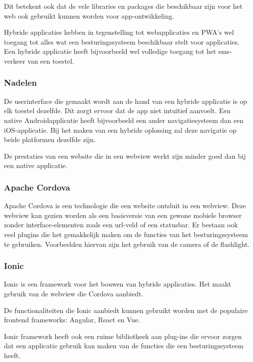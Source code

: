 		Dit betekent ook dat de vele libraries en packages die beschikbaar zijn voor het web ook gebruikt kunnen worden voor app-ontwikkeling.
		
		Hybride applicaties hebben in tegenstelling tot webapplicaties en PWA's wel toegang tot alles wat een besturingssysteem beschikbaar stelt voor applicaties. Een hybride applicatie heeft bijvoorbeeld wel volledige toegang tot het sms-verkeer van een toestel.
		\autocite{Ionic2020}
	
	\subsubsection{Nadelen}
		De userinterface die gemaakt wordt aan de hand van een hybride applicatie is op elk toestel dezelfde. Dit zorgt ervoor dat de app niet intuïtief aanvoelt. Een native Androidapplicatie heeft bijvoorbeeld een ander navigatiesysteem dan een iOS-applicatie. Bij het maken van een hybride oplossing zal deze navigatie op beide platformen dezelfde zijn.
		
		De prestaties van een website die in een webview werkt zijn minder goed dan bij een native applicatie.
		\autocite{Asp2017}	

		
	\subsubsection{Apache Cordova}
		Apache Cordova is een technologie die een website ontsluit in een webview. Deze webview kan gezien worden als een basisversie van een gewone mobiele browser zonder interface-elementen zoals een url-veld of een statusbar. Er bestaan ook veel plugins die het gemakkelijk maken om de functies van het besturingssysteem te gebruiken. Voorbeelden hiervan zijn het gebruik van de camera of de flashlight.
		
		
	\subsubsection{Ionic}
		Ionic is een framework voor het bouwen van hybride applicaties. Het maakt gebruik van de webview die Cordova aanbiedt.
		
		De functionaliteiten die Ionic aanbiedt kunnen gebruikt worden met de populaire frontend frameworks: Angular, React en Vue.
		
		Ionic framework heeft ook een ruime bibliotheek aan plug-ins die ervoor zorgen dat een applicatie gebruik kan maken van de functies die een besturingssysteem heeft.
		

